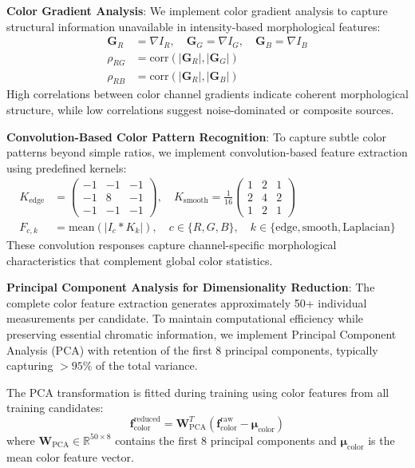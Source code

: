 \documentclass[twocolumn,10pt]{aastex631}
\begin{document}
\textbf{Color Gradient Analysis}: We implement color gradient analysis to capture structural information unavailable in intensity-based morphological features:
\begin{align}
\mathbf{G}_R &= \nabla I_R, \quad \mathbf{G}_G = \nabla I_G, \quad \mathbf{G}_B = \nabla I_B \\
\rho_{RG} &= \text{corr}(|\mathbf{G}_R|, |\mathbf{G}_G|) \\
\rho_{RB} &= \text{corr}(|\mathbf{G}_R|, |\mathbf{G}_B|)
\end{align}
High correlations between color channel gradients indicate coherent morphological structure, while low correlations suggest noise-dominated or composite sources.

\textbf{Convolution-Based Color Pattern Recognition}: To capture subtle color patterns beyond simple ratios, we implement convolution-based feature extraction using predefined kernels:
\begin{align}
K_{\text{edge}} &= \begin{pmatrix} -1 & -1 & -1 \\ -1 & 8 & -1 \\ -1 & -1 & -1 \end{pmatrix}, \quad 
K_{\text{smooth}} = \frac{1}{16}\begin{pmatrix} 1 & 2 & 1 \\ 2 & 4 & 2 \\ 1 & 2 & 1 \end{pmatrix} \\
F_{c,k} &= \text{mean}(|I_c * K_k|), \quad c \in \{R,G,B\}, \quad k \in \{\text{edge}, \text{smooth}, \text{Laplacian}\}
\end{align}
These convolution responses capture channel-specific morphological characteristics that complement global color statistics.

\textbf{Principal Component Analysis for Dimensionality Reduction}: The complete color feature extraction generates approximately 50+ individual measurements per candidate. To maintain computational efficiency while preserving essential chromatic information, we implement Principal Component Analysis (PCA) with retention of the first 8 principal components, typically capturing $>95\%$ of the total variance.

The PCA transformation is fitted during training using color features from all training candidates:
\begin{equation}
\mathbf{f}_{\text{color}}^{\text{reduced}} = \mathbf{W}_{\text{PCA}}^T (\mathbf{f}_{\text{color}}^{\text{raw}} - \boldsymbol{\mu}_{\text{color}})
\end{equation}
where $\mathbf{W}_{\text{PCA}} \in \mathbb{R}^{50 \times 8}$ contains the first 8 principal components and $\boldsymbol{\mu}_{\text{color}}$ is the mean color feature vector.
\end{document}
